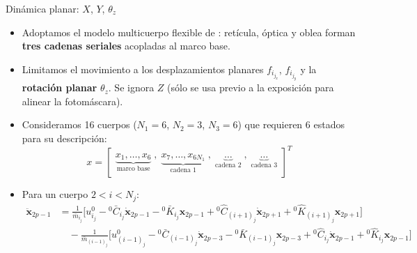 \documentclass[en,16:9,navbarinline,bigfoot]{sdqbeamer}
\begin{document}
\begin{frame}{Dinámica planar: $X$, $Y$, $\theta_z$}
    \begin{itemize}
        \item Adoptamos el modelo multicuerpo flexible de \cite{Al-Rawashdeh2022_Caracterization}: retícula, óptica y oblea forman \textbf{tres cadenas seriales} acopladas al marco base.
        \item Limitamos el movimiento a los desplazamientos planares $f_{i_{j_x}}$, $f_{i_{j_y}}$ y la \textbf{rotación planar} $\theta_z$. Se ignora $Z$ (sólo se usa previo a la exposición para alinear la fotomáscara).
        \item Consideramos 16 cuerpos ($N_1=6$, $N_2=3$, $N_3=6$) que requieren 6 estados para su descripción:
        \begin{equation*}
            x =
            \begin{bmatrix}
                \underbrace{x_1, \ldots, x_6}_{\text{marco base}} \;,\;
                \underbrace{x_7, \ldots, x_{6N_1}}_{\text{cadena 1}} \;,\;
                \underbrace{\ldots}_{\text{cadena 2}} \;,\;
                \underbrace{\ldots}_{\text{cadena 3}}
            \end{bmatrix}^T
        \end{equation*}
        \item Para un cuerpo $2 < i < N_j$:
        \begin{align*}
            \ddot{\mathbf{x}}_{2p-1} &= \tfrac{1}{\bar{m}_{i_j}}\big[u^0_{i_j} - {}^0\bar{C}_{i_j}\dot{\mathbf{x}}_{2p-1} - {}^0\bar{K}_{i_j}\mathbf{x}_{2p-1} + {}^0\hat{C}_{(i+1)_j}\dot{\mathbf{x}}_{2p+1} + {}^0\hat{K}_{(i+1)_j}\mathbf{x}_{2p+1}\big] \\
            &\quad - \tfrac{1}{\bar{m}_{(i-1)_j}}\big[u^0_{(i-1)_j} - {}^0\bar{C}_{(i-1)_j}\dot{\mathbf{x}}_{2p-3} - {}^0\bar{K}_{(i-1)_j}\mathbf{x}_{2p-3} + {}^0\hat{C}_{i_j}\dot{\mathbf{x}}_{2p-1} + {}^0\hat{K}_{i_j}\mathbf{x}_{2p-1}\big]
        \end{align*}
    \end{itemize}
\end{frame}
\end{document}
